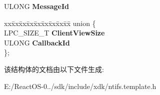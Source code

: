 \begin{DoxyCompactItemize}
\begin{tabbing}
\end{tabbing}\item 
\mbox{\label{struct___p_o_r_t___m_e_s_s_a_g_e_a5d9ee48cc90a51814f8f9474d04bff5f}} 
U\+L\+O\+NG {\bfseries Message\+Id}
\item 
\mbox{\label{struct___p_o_r_t___m_e_s_s_a_g_e_a8239afe9f6ed635c36e230b24a5a0309}} 
\begin{tabbing}
xx\=xx\=xx\=xx\=xx\=xx\=xx\=xx\=xx\=\kill
union \{\\
\>LPC\_SIZE\_T {\bfseries ClientViewSize}\\
\>ULONG {\bfseries CallbackId}\\
\}; \\

\end{tabbing}\end{DoxyCompactItemize}


该结构体的文档由以下文件生成\+:\begin{DoxyCompactItemize}
\item 
E\+:/\+React\+O\+S-\/0../sdk/include/xdk/ntifs.\+template.\+h\end{DoxyCompactItemize}
